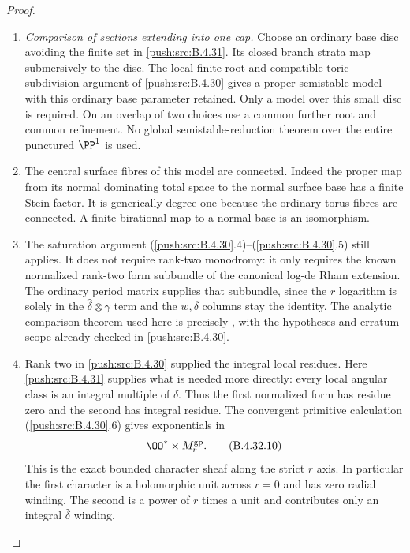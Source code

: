 \begin{proof}
\begin{enumerate}[label=\arabic*.,leftmargin=*]
\item \emph{Comparison of sections extending into one cap.}
Choose an ordinary base disc avoiding the finite set in
\ref{push:src:B.4.31}. Its closed branch strata map submersively to the
disc. The local finite root and compatible toric subdivision
argument of \ref{push:src:B.4.30} gives a proper semistable model with this
ordinary base parameter retained. Only a model over this
small disc is required. On an overlap of two choices use a
common further root and common refinement. No global
semistable-reduction theorem over the entire punctured
$\PP^1$ is used.

\item The central surface fibres of this model are connected.
Indeed the proper map from its normal dominating total space
to the normal surface base has a finite Stein factor.
It is generically degree one because the ordinary torus
fibres are connected. A finite birational map to a normal
base is an isomorphism.

\item The saturation argument (\ref{push:src:B.4.30}.4)--(\ref{push:src:B.4.30}.5) still applies.
It does not require rank-two monodromy: it only requires the
known normalized rank-two form subbundle of the canonical
log-de Rham extension. The ordinary period matrix supplies
that subbundle, since the $r$ logarithm is solely in the
$\widehat\delta\otimes\gamma$ term and the $w,\delta$
columns stay the identity. The analytic comparison theorem
used here is precisely
\citet[Theorem 6.3]{IKN2005E}, with the hypotheses and erratum
scope already checked in \ref{push:src:B.4.30}.

\item Rank two in \ref{push:src:B.4.30} supplied the integral local residues.
Here \ref{push:src:B.4.31} supplies what is needed more directly: every
local angular class is an integral multiple of
$\widehat\delta$. Thus the first normalized form has residue
zero and the second has integral residue. The convergent
primitive calculation (\ref{push:src:B.4.30}.6) gives exponentials in
\[
              \OO^*\times M_r^{\rm gp}.
 \tag{B.4.32.10}
\]
This is the exact bounded character sheaf along the strict
$r$ axis. In particular the first character is a holomorphic
unit across $r=0$ and has zero radial winding. The second
is a power of $r$ times a unit and contributes only an
integral $\widehat\delta$ winding.


\end{enumerate}
\end{proof}
